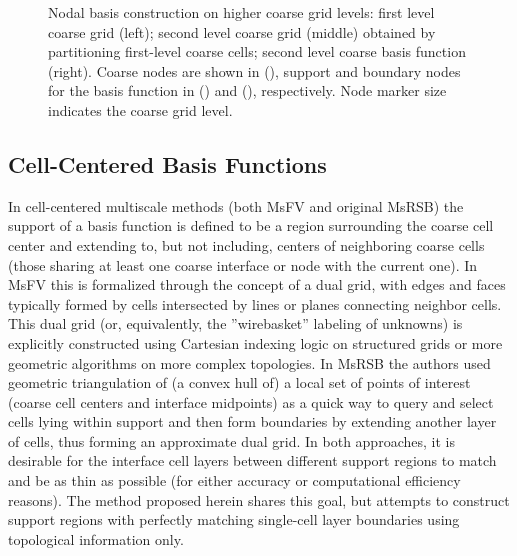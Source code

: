 \begin{figure}[htbp]
\begin{subfigure}[t]{0.3\textwidth}
  \end{subfigure}
  \caption[Higher level coarse grids and basis functions]{\label{fig:square_node_ml} Nodal basis construction on higher coarse grid levels: first level coarse grid (left); second level coarse grid (middle) obtained by partitioning first-level coarse cells; second level coarse basis function (right).   Coarse nodes are shown in (), support and boundary nodes for the basis function in () and (), respectively. Node marker size indicates the coarse grid level.}
\end{figure}

\subsection{Cell-Centered Basis Functions}
\label{subsec:msrsb_cell_basis}

In cell-centered multiscale methods (both MsFV and original MsRSB) the support of a basis function is defined to be a region surrounding the coarse cell center and extending to, but not including, centers of neighboring coarse cells (those sharing at least one coarse interface or node with the current one).   In MsFV this is formalized through the concept of a dual grid, with edges and faces typically formed by cells intersected by lines or planes connecting neighbor cells.   This dual grid (or, equivalently, the ''wirebasket'' labeling of unknowns) is explicitly constructed using Cartesian indexing logic on structured grids or more geometric algorithms on more complex topologies.   In MsRSB the authors used geometric triangulation of (a convex hull of) a local set of points of interest (coarse cell centers and interface midpoints) as a quick way to query and select cells lying within support and then form boundaries by extending another layer of cells, thus forming an approximate dual grid.   In both approaches, it is desirable for the interface cell layers between different support regions to match and be as thin as possible (for either accuracy or computational efficiency reasons).   The method proposed herein shares this goal, but attempts to construct support regions with perfectly matching single-cell layer boundaries using topological information only.

